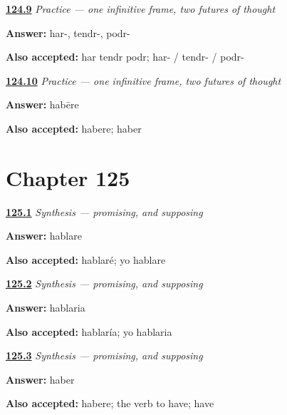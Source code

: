 \noindent\begin{minipage}[t]{\linewidth}
\raggedright
\hyperlink{review-ES-C17-practice-three-stems}{\textbf{124.9}} \emph{Practice — one infinitive frame, two futures of thought}\par
\small \textbf{Answer:} har-, tendr-, podr-\par
\footnotesize \textbf{Also accepted:} har tendr podr; har- / tendr- / podr-
\end{minipage}\par\medskip

\noindent\begin{minipage}[t]{\linewidth}
\raggedright
\hyperlink{review-ES-C17-practice-history}{\textbf{124.10}} \emph{Practice — one infinitive frame, two futures of thought}\par
\small \textbf{Answer:} habēre\par
\footnotesize \textbf{Also accepted:} habere; haber
\end{minipage}\par\medskip

\section*{Chapter 125}

\noindent\begin{minipage}[t]{\linewidth}
\raggedright
\hyperlink{review-ES-C17-sintesis-futuro-condicional-promise}{\textbf{125.1}} \emph{Synthesis — promising, and supposing}\par
\small \textbf{Answer:} hablare\par
\footnotesize \textbf{Also accepted:} hablaré; yo hablare
\end{minipage}\par\medskip

\noindent\begin{minipage}[t]{\linewidth}
\raggedright
\hyperlink{review-ES-C17-sintesis-futuro-condicional-suppose}{\textbf{125.2}} \emph{Synthesis — promising, and supposing}\par
\small \textbf{Answer:} hablaria\par
\footnotesize \textbf{Also accepted:} hablaría; yo hablaria
\end{minipage}\par\medskip

\noindent\begin{minipage}[t]{\linewidth}
\raggedright
\hyperlink{review-ES-C17-sintesis-futuro-condicional-why}{\textbf{125.3}} \emph{Synthesis — promising, and supposing}\par
\small \textbf{Answer:} haber\par
\footnotesize \textbf{Also accepted:} habere; the verb to have; have
\end{minipage}\par\medskip


